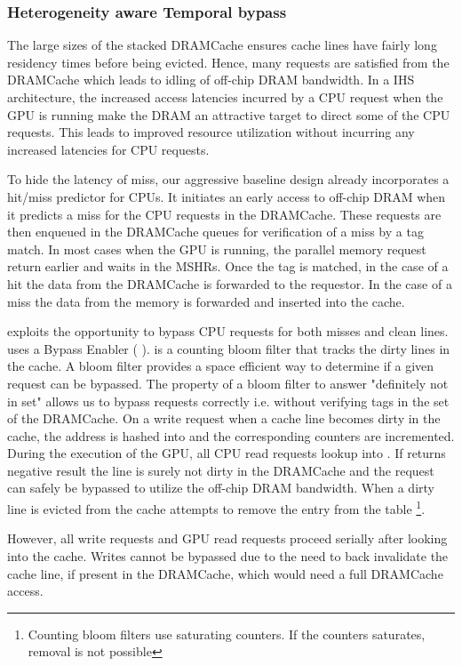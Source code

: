 \subsubsection{Heterogeneity aware Temporal bypass}
The large sizes of the stacked DRAMCache ensures cache lines have fairly long residency times before being evicted. Hence, many requests are satisfied from the DRAMCache which leads to idling of off-chip DRAM bandwidth.
In a IHS architecture, the increased access latencies incurred by a CPU request when the GPU is running make the DRAM an attractive target to direct some of the CPU requests. This leads to improved resource utilization without incurring any increased latencies for CPU requests. 
\par To hide the latency of miss, our aggressive baseline design already incorporates a hit/miss predictor for CPUs. It initiates an early access to off-chip DRAM when it predicts a miss for the CPU requests in the DRAMCache. These requests are then enqueued in the DRAMCache queues for verification of a miss by a tag match. 
In most cases when the GPU is running, the parallel memory request return earlier and waits in the MSHRs. Once the tag is matched, in the case of a hit the data from the DRAMCache is forwarded to the requestor. In the case of a miss the data from the memory is forwarded and inserted into the cache. 
\par \cachename exploits the opportunity to bypass CPU requests for both misses and clean lines. \cachename uses a Bypass Enabler ( \bypassname). \bypassname is a counting bloom filter that tracks the dirty lines in the cache. A bloom filter provides a space efficient way to determine if a given request can be bypassed. The property of a bloom filter to answer "definitely not in set" allows us to bypass requests correctly i.e. without verifying tags in the set of the DRAMCache. 
On a write request when a cache line becomes dirty in the cache, the address is hashed into \bypassname and the corresponding counters are incremented. 
During the execution of the GPU, all CPU read requests lookup into \bypassname. If \bypassname returns negative result the line is surely not dirty in the DRAMCache and the request can safely be bypassed to utilize the off-chip DRAM bandwidth. 
When a dirty line is evicted from the cache \bypassname attempts to remove the entry from the table \footnote{Counting bloom filters use saturating counters. If the counters saturates, removal is not possible}.
\par However, all write requests and GPU read requests proceed serially after looking into the cache. Writes cannot be bypassed due to the need to back invalidate the cache line, if present in the DRAMCache, which would need a full DRAMCache access.
